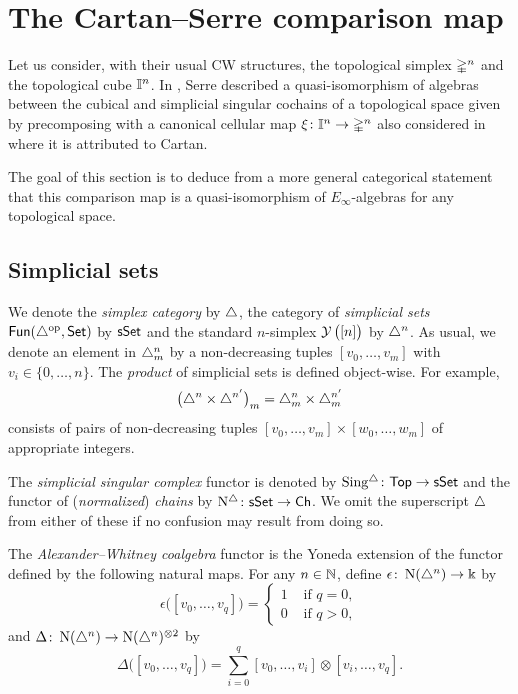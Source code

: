 
\section{The Cartan--Serre comparison map} \label{s:the cartan-serre comparison map}

Let us consider, with their usual CW structures, the topological simplex $\mathbb{\Delta}^n$ and the topological cube $\mathbb{I}^n$.
In \cite[p. 442]{serre1951homologie}, Serre described a quasi-isomorphism of algebras between the cubical and simplicial singular cochains of a topological space given by precomposing with a canonical cellular map $\operatorname{\xi} \colon \mathbb{I}^n \to \mathbb{\Delta}^n$ also considered in \cite[p.199]{eilenberg1953acyclic} where it is attributed to Cartan.

The goal of this section is to deduce from a more general categorical statement that this comparison map is a quasi-isomorphism of $E_\infty$-algebras for any topological space.

\subsection{Simplicial sets}

We denote the \textit{simplex category} by $\triangle$, the category of \textit{simplicial sets} $\mathsf{Fun}(\triangle^{\mathrm{op}}, \mathsf{Set})$ by $\mathsf{sSet}$ and the standard $n$-simplex $\operatorname{\mathcal{Y}}\big( [n] \big)$ by $\triangle^n$.
As usual, we denote an element in $\triangle^n_m$ by a non-decreasing tuples $[v_0, \dots, v_m]$ with $v_i \in \{0, \dots, n\}$.
The \textit{product} of simplicial sets is defined object-wise.
For example,
\[
\big(\triangle^n \times \triangle^{n^\prime}\big)_m = \triangle^n_m \times \triangle^{n^\prime}_m
\]
consists of pairs of non-decreasing tuples $[v_0, \dots, v_m] \times [w_0, \dots, w_m]$ of appropriate integers.

The \textit{simplicial singular complex} functor is denoted by $\operatorname{Sing^{\triangle}} \colon \mathsf{Top} \to \mathsf{sSet}$ and the functor of (\textit{normalized}) \textit{chains} by $\operatorname{N^{\triangle}} \colon \mathsf{sSet} \to \mathsf{Ch}$.
We omit the superscript $\triangle$ from either of these if no confusion may result from doing so.

The \textit{Alexander--Whitney coalgebra} functor is the Yoneda extension of the functor defined by the following natural maps.
For any $n \in \mathbb{N}$, define $\epsilon \colon \operatorname{N}(\triangle^n) \to \Bbbk$ by
\[
\epsilon \big( [v_0, \dots, v_q] \big) = \begin{cases} 1 & \text{ if } q = 0, \\ 0 & \text{ if } q>0, \end{cases}
\]
and $\Delta \colon \operatorname{N}(\triangle^n) \to \operatorname{N}(\triangle^n)^{\otimes 2}$ by
\[
\Delta \big( [v_0, \dots, v_q] \big) = \sum_{i=0}^q [v_0, \dots, v_i] \otimes [v_i, \dots, v_q].
\]




